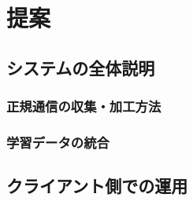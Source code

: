 \chapter{提案}
\section{システムの全体説明}
\subsection{正規通信の収集・加工方法}
\subsection{学習データの統合}
\section{クライアント側での運用}
